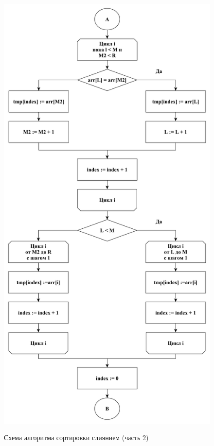 \documentclass[a4paper,12pt]{article}
\begin{document}
	    \begin{figure}[h!]
	    	\begin{center}
	    		{\includegraphics[scale = 0.48]{schema05.pdf}}
	    		\caption{Схема алгоритма сортировки слиянием (часть 2)}
	    		\label{fig:schema_merge_sort_2}
	    	\end{center}
	    \end{figure}
	\newpage
	\mbox{}
	\newpage
\end{document}
